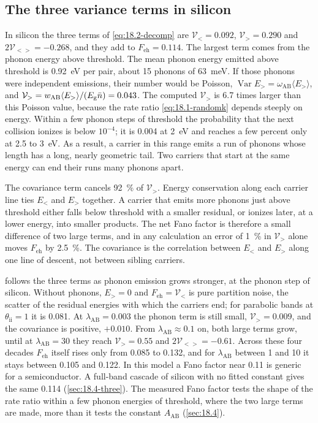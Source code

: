 \subsection{The three variance terms in silicon}\label{sec:18.2-silicon}

In silicon the three terms of \cref{eq:18.2-decomp} are $\mathcal{V}_< = 0.092$, $\mathcal{V}_> = 0.290$ and $2\mathcal{V}_{<>} = -0.268$, and they add to $F_{\mathrm{eh}} = 0.114$. The largest term comes from the phonon energy above threshold. The mean phonon energy emitted above threshold is \SI{0.92}{eV} per pair, about 15 phonons of \SI{63}{meV}. If those phonons were independent emissions, their number would be Poisson, $\operatorname{Var}E_> = \omega_{\mathrm{AB}}\langle E_>\rangle$, and $\mathcal{V}_> = w_{\mathrm{AB}}\langle E_>\rangle/(E_{\mathrm{g}}\bar n) = 0.043$. The computed $\mathcal{V}_>$ is 6.7 times larger than this Poisson value, because the rate ratio \cref{eq:18.1-randomk} depends steeply on energy. Within a few phonon steps of threshold the probability that the next collision ionizes is below $10^{-4}$; it is 0.004 at \SI{2}{eV} and reaches a few percent only at 2.5 to \SI{3}{eV}. As a result, a carrier in this range emits a run of phonons whose length has a long, nearly geometric tail. Two carriers that start at the same energy can end their runs many phonons apart.

The covariance term cancels \SI{92}{\percent} of $\mathcal{V}_>$. Energy conservation along each carrier line ties $E_<$ and $E_>$ together. A carrier that emits more phonons just above threshold either falls below threshold with a smaller residual, or ionizes later, at a lower energy, into smaller products. The net Fano factor is therefore a small difference of two large terms, and in any calculation an error of \SI{1}{\percent} in $\mathcal{V}_>$ alone moves $F_{\mathrm{eh}}$ by \SI{2.5}{\percent}. The covariance is the correlation between $E_<$ and $E_>$ along one line of descent, not between sibling carriers.

 follows the three terms as phonon emission grows stronger, at the phonon step of silicon. Without phonons, $E_> = 0$ and $F_{\mathrm{eh}} = \mathcal{V}_<$ is pure partition noise, the scatter of the residual energies with which the carriers end; for parabolic bands at $\theta_{\mathrm{ii}} = 1$ it is 0.081. At $\lambda_{\mathrm{AB}} = 0.003$ the phonon term is still small, $\mathcal{V}_> = 0.009$, and the covariance is positive, $+0.010$. From $\lambda_{\mathrm{AB}} \approx 0.1$ on, both large terms grow, until at $\lambda_{\mathrm{AB}} = 30$ they reach $\mathcal{V}_> = 0.55$ and $2\mathcal{V}_{<>} = -0.61$. Across these four decades $F_{\mathrm{eh}}$ itself rises only from 0.085 to 0.132, and for $\lambda_{\mathrm{AB}}$ between 1 and 10 it stays between 0.105 and 0.122. In this model a Fano factor near 0.11 is generic for a semiconductor. A full-band cascade of silicon with no fitted constant gives the same 0.114 (\cref{sec:18.4-three}). The measured Fano factor tests the shape of the rate ratio within a few phonon energies of threshold, where the two large terms are made, more than it tests the constant $A_{\mathrm{AB}}$ (\cref{sec:18.4}).

